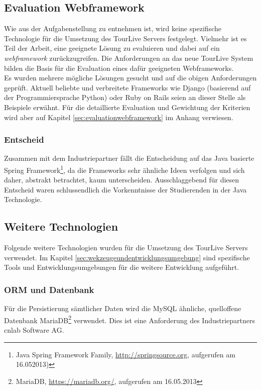 \subsection{Evaluation Webframework}
\label{sec:tourliveserverevaluationwebframework}
Wie aus der Aufgabenstellung zu entnehmen ist, wird keine spezifische Technologie für die Umsetzung des TourLive Servers festgelegt. Vielmehr ist es Teil der Arbeit, eine geeignete Lösung zu evaluieren und dabei auf ein \textit{\gls{webframework}} zurückzugreifen.
Die Anforderungen an das neue TourLive System bilden die Basis für die Evaluation eines dafür geeigneten Webframeworks.
\\

Es wurden mehrere mögliche Lösungen gesucht und auf die obigen Anforderungen geprüft. Aktuell beliebte und verbreitete Frameworks wie Django (basierend auf der Programmiersprache Python) oder Ruby on Rails seien an dieser Stelle als Beispiele erwähnt. Für die detaillierte Evaluation und Gewichtung der Kriterien wird aber auf Kapitel \ref{sec:evaluationwebframework} im Anhang verwiesen.

\subsubsection{Entscheid}
Zusammen mit dem Industriepartner fällt die Entscheidung auf das Java basierte Spring Framework\footnote{Java Spring Framework Family, \url{http://springsource.org}, aufgerufen am 16.052013)}, da die Frameworks sehr ähnliche Ideen verfolgen und sich daher, abstrakt betrachtet, kaum unterscheiden. Ausschlaggebend für diesen Entscheid waren schlussendlich die Vorkenntnisse der Studierenden in der Java Technologie. 

\subsection{Weitere Technologien}
\label{sec:tourlivetechnologien}
Folgende weitere Technologien wurden für die Umsetzung des TourLive Servers verwendet. Im Kapitel \ref{sec:wekzeugeundentwicklungsumgebung} sind spezifische Tools und Entwicklungsumgebungen für die weitere Entwicklung aufgeführt.

\subsubsection{ORM und Datenbank}
Für die Persistierung sämtlicher Daten wird die MySQL ähnliche, quelloffene Datenbank MariaDB\footnote{MariaDB, \url{https://mariadb.org/}, aufgerufen am 16.05.2013} verwendet. Dies ist eine Anforderung des Industriepartners cnlab Software AG.
\\

